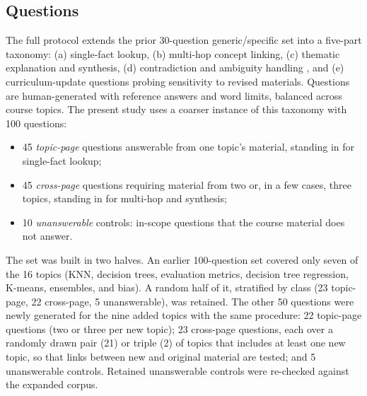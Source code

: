 \documentclass[letterpaper]{article} %
\begin{document}
\subsection{Questions}

The full protocol extends the prior 30-question generic/specific set into a five-part taxonomy: (a) single-fact lookup, (b) multi-hop concept linking, (c) thematic explanation and synthesis, (d) contradiction and ambiguity handling \citep{hou2024wikicontradict}, and (e) curriculum-update questions probing sensitivity to revised materials. Questions are human-generated with reference answers and word limits, balanced across course topics. The present study uses a coarser instance of this taxonomy with 100 questions:
\begin{itemize}
\item 45 \emph{topic-page} questions answerable from one topic's material, standing in for single-fact lookup;
\item 45 \emph{cross-page} questions requiring material from two or, in a few cases, three topics, standing in for multi-hop and synthesis;
\item 10 \emph{unanswerable} controls: in-scope questions that the course material does not answer.
\end{itemize}
The set was built in two halves. An earlier 100-question set covered only seven of the 16 topics (KNN, decision trees, evaluation metrics, decision tree regression, K-means, ensembles, and bias). A random half of it, stratified by class (23 topic-page, 22 cross-page, 5 unanswerable), was retained. The other 50 questions were newly generated for the nine added topics with the same procedure: 22 topic-page questions (two or three per new topic); 23 cross-page questions, each over a randomly drawn pair (21) or triple (2) of topics that includes at least one new topic, so that links between new and original material are tested; and 5 unanswerable controls. Retained unanswerable controls were re-checked against the expanded corpus.
\end{document}
